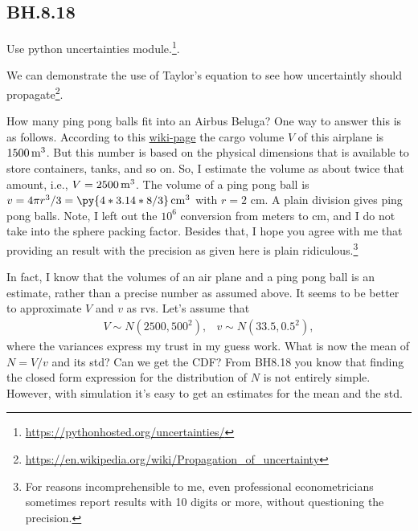 \subsection{BH.8.18}


Use python uncertainties module.\footnote{\url{https://pythonhosted.org/uncertainties/}}.


We can demonstrate the use of Taylor's equation to see how uncertaintly should propagate\footnote{\url{https://en.wikipedia.org/wiki/Propagation_of_uncertainty}}.



How many ping pong balls fit into an Airbus Beluga?
One way to answer this is as follows.
According to this \href{https://en.wikipedia.org/wiki/Airbus\_Beluga}{wiki-page} the cargo volume $V$ of this airplane is $1500 \,\mathrm{m}^{3}$.
But this number is based on the physical dimensions that is available to store containers, tanks, and so on.
So, I estimate the volume as about twice that amount, i.e., $V = 2500 \,\mathrm{m}^{3}$.
The volume of a ping pong ball is $v = 4 \pi r^3/3  = \py{4*3.14*8/3} \cm^{3}$ with $r=2$ cm.
A plain division gives  ping pong balls.
Note, I left out the $10^{6}$ conversion from meters to cm, and I do not take into the sphere packing factor.
Besides that, I hope you agree with me that providing an result with the precision as given here is plain ridiculous.\footnote{For reasons incomprehensible to me, even professional econometricians sometimes  report results with 10 digits or more, without questioning the precision.}


In fact, I know that the volumes of an air plane and a ping pong ball is an estimate, rather than a precise number as assumed above.
It seems to be better to approximate $V$ and $v$ as rvs.
Let's assume that
   \begin{align*}
V \sim N(2500, 500^{2}), & v \sim N(33.5, 0.5^{2}),
\end{align*}
where the variances express my trust in my guess work.
What is now the mean of $N = V/v$ and its std? Can we get the CDF?
From BH8.18 you know that finding the closed form expression for the distribution of $N$ is not entirely simple.
However, with simulation it's easy to get an estimates for the mean and the std.


